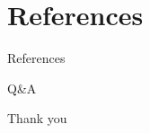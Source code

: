 \documentclass[11pt]{beamer}
\begin{document}
\section{References}
\begin{frame}{References}
	\nocite{*}
	\newpage\cleardoublepage
	
\end{frame}
\begin{frame}{Q\&A}
	\begin{center}
		\Huge Thank you
	\end{center}
\end{frame}
\end{document}

